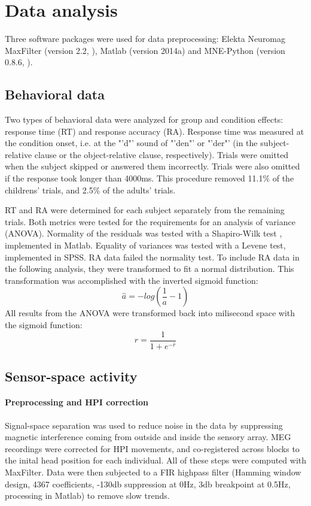 \section{Data analysis}

Three software packages were used for data preprocessing: Elekta Neuromag\textsuperscript{\textregistered} MaxFilter (version 2.2, \cite{3.3.MNE}), Matlab (version 2014a) and MNE-Python (version 0.8.6, \cite{3.3.MNEpython}).

\subsection{Behavioral data}

Two types of behavioral data were analyzed for group and condition effects: response time (RT) and response accuracy (RA).
Response time was measured at the condition onset, i.e. at the "'d"' sound of "'den"' or "'der"' (in the subject-relative clause or the object-relative clause, respectively).
Trials were omitted when the subject skipped or answered them incorrectly.
Trials were also omitted if the response took longer than 4000ms.
This procedure removed 11.1\% of the childrens' trials, and 2.5\% of the adults' trials.

RT and RA were determined for each subject separately from the remaining trials.
Both metrics were tested for the requirements for an analysis of variance (ANOVA).
Normality of the residuals was tested with a Shapiro-Wilk test \cite{3.3.swtest}, implemented in Matlab.
Equality of variances was tested with a Levene test\cite{3.3.levtest}, implemented in SPSS.
RA data failed the normality test.
To include RA data in the following analysis, they were transformed to fit a normal distribution.
This transformation was accomplished with the inverted sigmoid function:
\[ \hat{a} = - log( \frac{1}{a} - 1 ) \]
All results from the ANOVA were transformed back into milisecond space with the sigmoid function:
\[ r = \frac{1}{1+e^{-\hat{r}}} \]


\subsection{Sensor-space activity}

\paragraph{Preprocessing and HPI correction}
Signal-space separation \cite{3.3.SSS} was used to reduce noise in the data by suppressing magnetic interference coming from outside and inside the sensory array.
MEG recordings were corrected for HPI movements, and co-registered across blocks to the inital head position for each individual.
All of these steps were computed with MaxFilter.
Data were then subjected to a FIR highpass filter (Hamming window design, 4367 coefficients, -130db suppression at 0Hz, 3db breakpoint at 0.5Hz, processing in Matlab) to remove slow trends.

